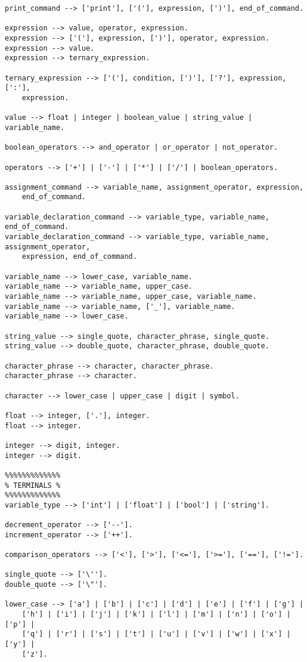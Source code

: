 \documentclass[12pt,letterpaper]{article}
\begin{document}
\begin{verbatim}
print_command --> ['print'], ['('], expression, [')'], end_of_command.

expression --> value, operator, expression.
expression --> ['('], expression, [')'], operator, expression.
expression --> value.
expression --> ternary_expression.

ternary_expression --> ['('], condition, [')'], ['?'], expression, [':'],
    expression.

value --> float | integer | boolean_value | string_value | variable_name.

boolean_operators --> and_operator | or_operator | not_operator.

operators --> ['+'] | ['-'] | ['*'] | ['/'] | boolean_operators.

assignment_command --> variable_name, assignment_operator, expression,
    end_of_command.

variable_declaration_command --> variable_type, variable_name, end_of_command.
variable_declaration_command --> variable_type, variable_name, assignment_operator,
    expression, end_of_command.

variable_name --> lower_case, variable_name.
variable_name --> variable_name, upper_case.
variable_name --> variable_name, upper_case, variable_name.
variable_name --> variable_name, ['_'], variable_name.
variable_name --> lower_case.

string_value --> single_quote, character_phrase, single_quote.
string_value --> double_quote, character_phrase, double_quote.

character_phrase --> character, character_phrase.
character_phrase --> character.

character --> lower_case | upper_case | digit | symbol.

float --> integer, ['.'], integer.
float --> integer.

integer --> digit, integer.
integer --> digit.

%%%%%%%%%%%%%
% TERMINALS %
%%%%%%%%%%%%%
variable_type --> ['int'] | ['float'] | ['bool'] | ['string'].

decrement_operator --> ['--'].
increment_operator --> ['++'].

comparison_operators --> ['<'], ['>'], ['<='], ['>='], ['=='], ['!='].

single_quote --> ['\''].
double_quote --> ['\"'].

lower_case --> ['a'] | ['b'] | ['c'] | ['d'] | ['e'] | ['f'] | ['g'] |
    ['h'] | ['i'] | ['j'] | ['k'] | ['l'] | ['m'] | ['n'] | ['o'] | ['p'] |
    ['q'] | ['r'] | ['s'] | ['t'] | ['u'] | ['v'] | ['w'] | ['x'] | ['y'] |
    ['z'].


\end{verbatim}
\end{document}

